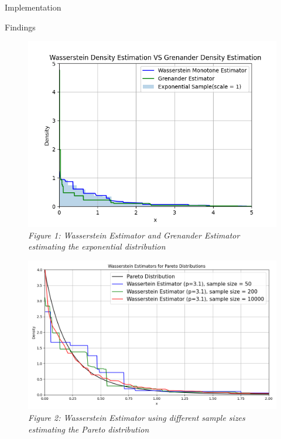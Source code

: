\documentclass[final]{beamer}
\newlength{\colwidth}
\begin{document}
\begin{frame}[t]
\begin{columns}[t]
\begin{column}{\colwidth}
\begin{alertblock}{Implementation}
\begin{itemize}
\end{itemize}
   \end{alertblock}
\begin{block}{Findings}

\centering

\vspace{0.1em}


\begin{subfigure}[b]{0.45\textwidth}
  \centering
  \includegraphics[width=\textwidth]{UofT Poster Template Tex/figures/WDE VS GDE.png}
  {\small\textit{Figure 1: Wasserstein Estimator and Grenander Estimator estimating the exponential distribution}}

\end{subfigure}
\hfill
\begin{subfigure}[b]{0.5\textwidth}
  \centering
  \includegraphics[width=\textwidth]{UofT Poster Template Tex/figures/Pareto_distributions.png}
  \small\textit{Figure 2: Wasserstein Estimator using different sample sizes estimating the Pareto distribution}
\end{subfigure}


\end{block}
\end{column}
\end{columns}
\end{frame}
\end{document}
